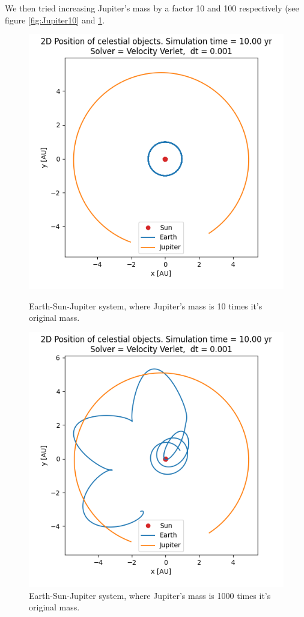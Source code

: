 \documentclass[american,a4paper,12pt]{article}
\begin{document}
We then tried increasing Jupiter's mass by a factor 10 and 100 respectively (see figure \ref{fig:Jupiter10} and \ref{fig:Jupiter1000}.
\begin{figure}[H]
  \centering
  \begin{minipage}[b]{0.49\textwidth}
    \includegraphics[width=\textwidth]{figures/Jupiter10.png}
    \caption{Earth-Sun-Jupiter system, where Jupiter's mass is 10 times it's original mass.}
    \label{fig:Jupiter10}
  \end{minipage}
  \hfill
  \begin{minipage}[b]{0.49\textwidth}
    \includegraphics[width=\textwidth]{figures/Jupiter1000.png}
    \caption{Earth-Sun-Jupiter system, where Jupiter's mass is 1000 times it's original mass.}
    \label{fig:Jupiter1000}
  \end{minipage}
\end{figure}
\end{document}
